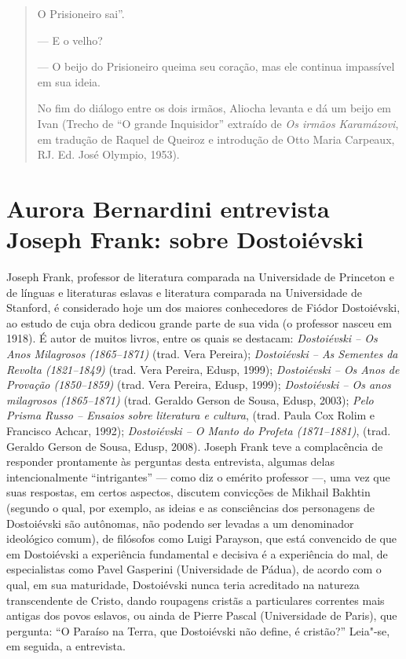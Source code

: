 \begin{quote}
O Prisioneiro sai''.

--- E o velho?

--- O beijo do Prisioneiro queima seu coração, mas ele continua impassível
em sua ideia.

No fim do diálogo entre os dois irmãos, Aliocha levanta e dá um beijo em
Ivan (Trecho de ``O grande Inquisidor'' extraído de \emph{Os irmãos Karamázovi}, em tradução de Raquel de Queiroz e introdução de Otto Maria Carpeaux, RJ. Ed. José Olympio, 1953).
\end{quote}

\chapter*{Aurora Bernardini entrevista Joseph Frank: sobre Dostoiévski}





Joseph Frank, professor de literatura comparada na Universidade de
Princeton e de línguas e literaturas eslavas e literatura comparada na
Universidade de Stanford, é considerado hoje um dos maiores conhecedores
de Fiódor Dostoiévski, ao estudo de cuja obra dedicou grande parte de
sua vida (o professor nasceu em 1918). É autor de muitos livros, entre
os quais se destacam: \emph{Dostoiévski -- Os Anos Milagrosos (1865--1871)}
(trad. Vera Pereira); \emph{Dostoiévski -- As Sementes da Revolta (1821--1849)}
(trad. Vera Pereira, Edusp, 1999); \emph{Dostoiévski -- Os Anos de Provação
(1850--1859)} (trad. Vera Pereira, Edusp, 1999); \emph{Dostoiévski -- Os anos
milagrosos (1865--1871)} (trad. Geraldo Gerson de Sousa, Edusp,
2003); \emph{Pelo Prisma Russo -- Ensaios sobre literatura e cultura}, (trad.
Paula Cox Rolim e Francisco Achcar, 1992); \emph{Dostoiévski -- O Manto do
Profeta (1871--1881)}, (trad. Geraldo Gerson de Sousa, Edusp, 2008). Joseph
Frank teve a complacência de responder prontamente às perguntas desta
entrevista, algumas delas intencionalmente ``intrigantes'' --- como diz o
emérito professor ---, uma vez que suas respostas, em certos aspectos,
discutem convicções de Mikhail Bakhtin (segundo o qual, por exemplo, as
ideias e as consciências dos personagens de Dostoiévski são autônomas,
não podendo ser levadas a um denominador ideológico comum), de filósofos
como Luigi Parayson, que está convencido de que em Dostoiévski a
experiência fundamental e decisiva é a experiência do mal, de
especialistas como Pavel Gasperini (Universidade de Pádua), de acordo
com o qual, em sua maturidade, Dostoiévski nunca teria acreditado na
natureza transcendente de Cristo, dando roupagens cristãs a particulares
correntes mais antigas dos povos eslavos, ou ainda de Pierre Pascal
(Universidade de Paris), que pergunta: ``O Paraíso na Terra, que
Dostoiévski não define, é cristão?'' Leia"-se, em seguida, a entrevista.

